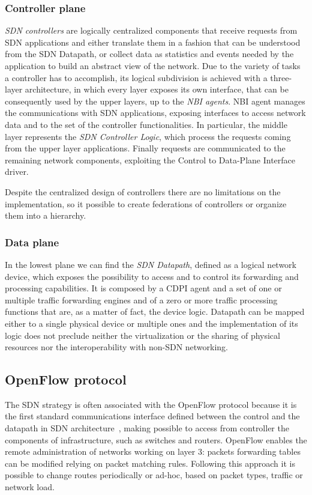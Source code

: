 \subsubsection{Controller plane}

\emph{SDN controllers} are logically centralized components that
receive requests from SDN applications and either translate them 
in a fashion that can be understood from the SDN Datapath, or collect 
data as statistics and events needed by the application to build an abstract
view of the network.  Due to the variety of tasks a controller has to
accomplish, its logical subdivision is achieved with a three-layer architecture,
in which every layer exposes its own interface, that can be consequently used by
the upper layers, up to the \emph{NBI agents}.
NBI agent manages the communications with SDN applications, exposing interfaces
to access network data and to the set of the controller functionalities.
In particular, the middle layer represents the \emph{SDN Controller Logic},
which process the requests coming from the upper layer applications. Finally
requests are communicated to the remaining network components, exploiting the
Control to Data-Plane Interface driver.

Despite the centralized design of controllers there are no limitations on the
implementation, so it possible to create federations of controllers or organize
them into a hierarchy.

\subsubsection{Data plane}
In the lowest plane we can find the \emph{SDN Datapath}, defined as a logical
network device, which exposes the possibility to access and to control its
forwarding and processing capabilities. It is composed by a CDPI agent and a set
of one or multiple traffic forwarding engines and of a zero or more traffic
processing functions that are, as a matter of fact, the device logic. Datapath
can be mapped either to a single physical device or multiple ones and the
implementation of its logic does not preclude neither the virtualization or
the sharing of physical resources nor the interoperability with non-SDN
networking.

\subsection{OpenFlow protocol}
The SDN strategy is often associated with the OpenFlow protocol because it is
the first standard communications interface defined between the control and the
datapath in SDN architecture~\cite{fundation2013software}, making possible to
access from controller the components of infrastructure, such as switches and
routers. OpenFlow enables the remote administration of networks working on 
layer 3: packets forwarding tables can be modified relying on packet matching 
rules. Following this approach it is possible to change routes periodically or 
ad-hoc, based on packet types, traffic or network load.

